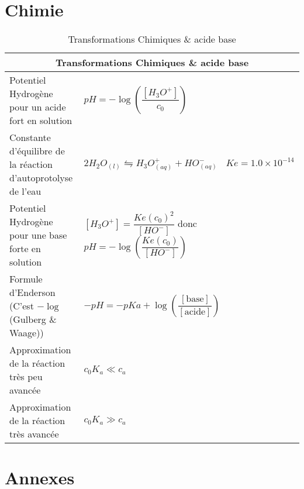 \documentclass[10pt,a4paper,titlepage,landscape]{article}
\renewcommand{\arraystretch}{2}
\begin{document}
\section{Chimie}

\begin{table}[H]
    \centering
    \renewcommand{\arraystretch}{1.5} %
    \setlength{\tabcolsep}{8pt} %
    \begin{tabular}{@{}|p{9cm}|p{10cm}@{}|}

        \multicolumn{2}{c}{\textbf{Transformations Chimiques \& acide base}} \\ \hline


        Potentiel Hydrogène pour un acide fort en solution & $pH = -\log\left(\dfrac{[H_3O^+]}{c_0}\right)$ \\ \hline
        Constante d'équilibre de la réaction d'autoprotolyse de l'eau & $2H_2 O_{(l)} \leftrightharpoons H_3O^+_{(aq)} + HO^-_{(aq)} \ \ \ \ Ke = 1.0\times10^{-14}$ \\ \hline
        Potentiel Hydrogène pour une base forte en solution & $[H_3O^+] = \dfrac{Ke(c_0)^2}{[HO^-]}$ donc $pH = -\log\left(\dfrac{Ke(c_0)}{[HO^-]}\right)$ \\ \hline
        Formule d'Enderson (C'est $-\log$(Gulberg \& Waage)) & $-pH = -pKa + \log\left(\dfrac{[\text{base}]}{[\text{acide}]}\right)$ \\ \hline
        Approximation de la réaction très peu avancée & $c_0K_a \ll c_a$ \\ \hline
        Approximation de la réaction très avancée & $c_0K_a \gg c_a$ \\ \hline
\end{tabular}
\caption{Transformations Chimiques \& acide base}
\label{tab:chem}
\end{table}


\section{Annexes}
\end{document}
